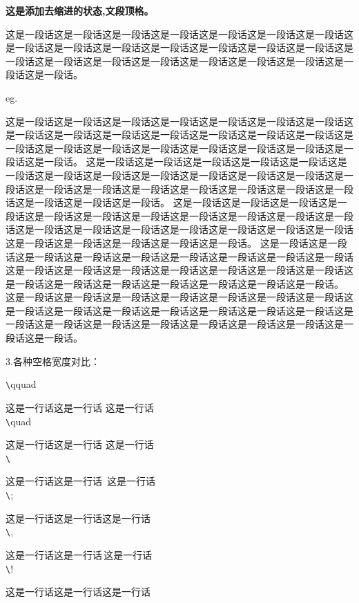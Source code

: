 \documentclass[normalsize]{article}   %
\begin{document}
			\noindent \textbf{这是添加去缩进的状态,文段顶格。}
			
			\noindent 这是一段话这是一段话这是一段话这是一段话这是一段话这是一段话这是一段话这是一段话这是一段话这是一段话这是一段话这是一段话这是一段话这是一段话这是一段话这是一段话这是一段话这是一段话这是一段话这是一段话这是一段话这是一段话这是一段话。
			
			
			eg.
			
			 这是一段话这是一段话这是一段话\qquad 这是一段\quad 话这是一段话这是一段话这是一段话这是一段话这是一段话这是一段话这是一段话这是一段话这是一段话这是一段话这是一段话这是一段话这是一段话这是一段话这是一段话这是一段话这是一段话这是一段话这是一段话。 这是一段话这是一段话这是一段话这是一段话这是一段话这是一段话这是一段话这是一段话这是一段话这是一段话这是一段话这是一段话这是一段话这是一段话这是一段话这是一段话这是一段话这是一段话这是一段话这是一段话这是一段话这是一段话这是一段话。 这是一段话这是一段话这是一段话这是一段话这是一段话这是一段话这是一段话这是一段话这是一段话这是一段话这是一段话这是一段话这是一段话这是一段话这是一段话这是一段话这是一段话这是一段话这是一段话这是一段话这是一段话这是一段话这是一段话。 这是一段话这是一段话这是一段话这是一段话这是一段话这是一段话这是一段话这是一段话这是一段话这是一段话这是一段话这是一段话这是一段话这是一段话这是一段话这是一段话这是一段话这是一段话这是一段话这是一段话这是一段话这是一段话这是一段话。 这是一段话这是一段话这是一段话这是一段话这是一段话这是一段话这是一段话这是一段话这是一段话这是一段话这是一段话这是一段话这是一段话这是一段话这是一段话这是一段话这是一段话这是一段话这是一段话这是一段话这是一段话这是一段话这是一段话。	
			
      \noindent 3.各种空格宽度对比：
      
		\noindent\verb|\|qquad 
		
		  \noindent	这是一行话这是一行话 \qquad 这是一行话\\
		 \verb|\|quad 
		 
		  	 \noindent	这是一行话这是一行话 \quad 这是一行话\\
		  \verb|\| 
		  	  	
		  	 \noindent	这是一行话这是一行话\ 这是一行话\\
		  \verb|\|;
		  
		  	 \noindent	这是一行话这是一行话\;这是一行话\\
		  \verb|\|, 
		  	
		  	 \noindent	这是一行话这是一行话\,这是一行话\\
		  \verb|\|!	
		  
		  	 \noindent	这是一行话这是一行话\!这是一行话\\
		  	
\end{document}

